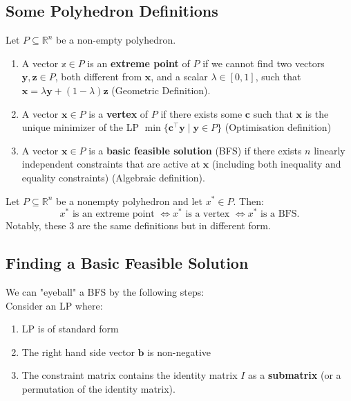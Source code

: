 \documentclass{article}
\begin{document}
\subsection{Some Polyhedron Definitions}

Let $P \subseteq \mathbb{R}^{n}$ be a non-empty polyhedron. 

\begin{enumerate}
    \item A vector $\mathbb{x} \in P$ is an \textbf{extreme point} of $P$ if we cannot find two vectors $\mathbf{y}, \mathbf{z} \in P$, both different from $\mathbf{x}$, and a scalar $\lambda \in [0,1]$, such that $\mathbf{x} = \lambda \mathbf{y} + (1- \lambda) \mathbf{z} $ (Geometric Definition). 
    \item A vector $\mathbf{x} \in P$ is a \textbf{vertex} of $P$ if there exists some $\mathbf{c}$ such that $\mathbf{x}$ is the unique minimizer of the LP $\min \{\mathbf{c}^{\top}\mathbf{y} \mid \mathbf{y} \in P\}$ (Optimisation definition)
    \item A vector $\mathbf{x} \in P$ is a \textbf{basic feasible solution} (BFS) if there exists $n$ linearly independent constraints that are active at $\mathbf{x}$ (including both inequality and equality constraints) (Algebraic definition). 
\end{enumerate}

\begin{theorem}
    Let $P \subseteq \mathbb{R}^{n}$ be a nonempty polyhedron and let $x^{*} \in P$. Then: \begin{equation*}
        x^{*} \text{ is an extreme point } \Longleftrightarrow x^{*} \text{ is a vertex } \Longleftrightarrow x^{*} \text{ is a BFS.}
    \end{equation*} Notably, these 3 are the same definitions but in different form.
\end{theorem}


\subsection{Finding a Basic Feasible Solution}
We can "eyeball" a BFS by the following steps: \\ 

\noindent Consider an LP where: 

\begin{enumerate}
    \item LP is of standard form
    \item The right hand side vector $\mathbf{b}$ is non-negative
    \item The constraint matrix contains the identity matrix $I$ as a \textbf{submatrix} (or a permutation of the identity matrix). 
\end{enumerate}
\end{document}
